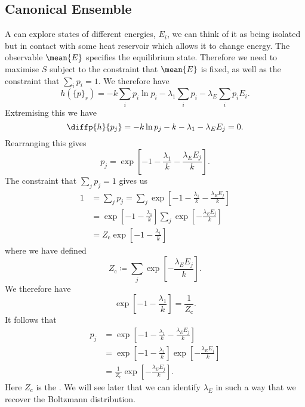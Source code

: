 \documentclass[fleqn]{NotesClass}
\newcommand*{\cpartition}{Z_{\mathrm{c}}}
\begin{document}
    \subsection{Canonical Ensemble}
    A  can explore states of different energies, \(E_i\), we can think of it as being isolated but in contact with some heat reservoir which allows it to change energy.
    The observable \(\mean{E}\) specifies the equilibrium state.
    Therefore we need to maximise \(S\) subject to the constraint that \(\mean{E}\) is fixed, as well as the constraint that \(\sum_i p_i = 1\).
    We therefore have
    \begin{equation}
        h(\{p\}_r) = -k\sum_i p_i \ln p_i - \lambda_1 \sum_i p_i - \lambda_E \sum_i p_i E_i.
    \end{equation}
    Extremising this we have
    \begin{equation}
        \diffp{h}{p_j} = -k\ln p_j - k - \lambda_1 - \lambda_E E_j = 0.
    \end{equation}
    Rearranging this gives 
    \begin{equation}
        p_j = \exp\left[ -1 - \frac{\lambda_1}{k} - \frac{\lambda_E E_j}{k} \right].
    \end{equation}
    The constraint that \(\sum_j p_j = 1\) gives us
    \begin{align}
        1 &= \sum_j p_j = \sum_j \exp\left[ -1 - \frac{\lambda_1}{k} - \frac{\lambda_E E_j}{k} \right]\\
        &= \exp\left[ -1 - \frac{\lambda_1}{k} \right]\sum_j \exp\left[ -\frac{\lambda_E E_j}{k} \right]\\
        &= \cpartition\exp[-1 - \frac{\lambda_1}{k}]
    \end{align}
    where we have defined
    \begin{equation}
        \cpartition \coloneqq \sum_j \exp\left[ -\frac{\lambda_E E_j}{k} \right].
    \end{equation}
    We therefore have
    \begin{equation}
        \exp\left[ -1 - \frac{\lambda_1}{k} \right] = \frac{1}{\cpartition}.
    \end{equation}
    It follows that
    \begin{align}
        p_j &= \exp\left[ -1 - \frac{\lambda_1}{k} - \frac{\lambda_E E_j}{k} \right]\\
        &= \exp\left[ -1 - \frac{\lambda_1}{k} \right] \exp\left[ -\frac{\lambda_E E_j}{k} \right]\\
        &= \frac{1}{\cpartition} \exp\left[ -\frac{\lambda_E E_j}{k} \right].
    \end{align}
    Here \(\cpartition\) is the .
    We will see later that we can identify \(\lambda_E\) in such a way that we recover the Boltzmann distribution.
    
\end{document}
